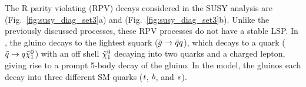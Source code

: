 The R parity violating (RPV) decays considered in the SUSY analysis are \ToqqqqL
(Fig.~\ref{fig:susy_diag_set3}a) and \Totbs (Fig.~\ref{fig:susy_diag_set3}b). 
Unlike the previously discussed processes, these RPV processes do not have a stable
LSP.
In \ToqqqqL, the gluino decays to the lightest squark ($\tilde{g} \to \tilde{q}
q$), which decays to a quark ($\tilde{q} \to q \tilde{\chi}_1^0$)
with an off shell $\tilde{\chi}_1^0$ decaying into two quarks and a charged
lepton, giving rise to a prompt 5-body decay of the gluino. In the \Totbs model, the
gluinos each decay into three different SM quarks ($t$, $b$, and $s$).

\begin{figure}[htb!]
    \centering
     \\
     \\

\end{figure}
